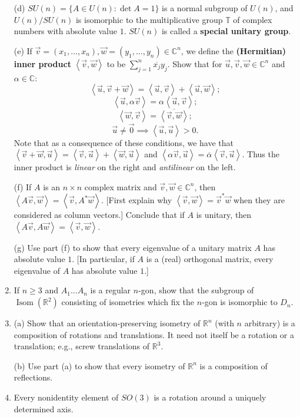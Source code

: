 \documentclass[leqno]{book}
\begin{document}
\begin{enumerate}
(d) $SU(n)=\{A\in U(n):\det A=1\}$ is a normal subgroup of $U(n)$, and $U(n)/SU(n)$ is isomorphic to the multiplicative group $\mathbb T$ of complex numbers with absolute value $1$.  $SU(n)$ is called a \textbf{special unitary group}.

(e) If $\vec v=(x_1,\dots,x_n),\vec w=(y_1,\dots,y_n)\in\mathbb C^n$, we define the \textbf{(Hermitian) inner product} $\left<\vec v,\vec w\right>$ to be $\sum_{j=1}^n\overline{x_j}y_j$.  Show that for $\vec u,\vec v,\vec w\in\mathbb C^n$ and $\alpha\in\mathbb C$:
$$\left<\vec u,\vec v+\vec w\right>=\left<\vec u,\vec v\right>+\left<\vec u,\vec w\right>;$$
$$\left<\vec u,\alpha\vec v\right>=\alpha\left<\vec u,\vec v\right>;$$
$$\left<\vec w,\vec v\right>=\overline{\left<\vec v,\vec w\right>};$$
$$\vec u\ne\vec 0\implies\left<\vec u,\vec u\right>>0.$$
Note that as a consequence of these conditions, we have that $\left<\vec v+\vec w,\vec u\right>=\left<\vec v,\vec u\right>+\left<\vec w,\vec u\right>$ and $\left<\alpha\vec v,\vec u\right>=\overline{\alpha}\left<\vec v,\vec u\right>$.  Thus the inner product is \emph{linear} on the right and \emph{antilinear} on the left.

(f) If $A$ is an $n\times n$ complex matrix and $\vec v,\vec w\in\mathbb C^n$, then $\left<A\vec v,\vec w\right>=\left<\vec v,A^*\vec w\right>$.  [First explain why $\left<\vec v,\vec w\right>=\vec v^*\vec w$ when they are considered as column vectors.]  Conclude that if $A$ is unitary, then $\left<A\vec v,A\vec w\right>=\left<\vec v,\vec w\right>$.

(g) Use part (f) to show that every eigenvalue of a unitary matrix $A$ has absolute value $1$.  [In particular, if $A$ is a (real) orthogonal matrix, every eigenvalue of $A$ has absolute value $1$.]

\item If $n\geqslant 3$ and $A_1\dots A_n$ is a regular $n$-gon, show that the subgroup of $\operatorname{Isom}(\mathbb R^2)$ consisting of isometries which fix the $n$-gon is isomorphic to $D_n$.

\item (a) Show that an orientation-preserving isometry of $\mathbb R^n$ (with $n$ arbitrary) is a composition of rotations and translations.  It need not itself be a rotation or a translation; e.g., screw translations of $\mathbb R^3$.

(b) Use part (a) to show that every isometry of $\mathbb R^n$ is a composition of reflections.

\item Every nonidentity element of $SO(3)$ is a rotation around a uniquely determined axis.


\end{enumerate}
\end{document}
